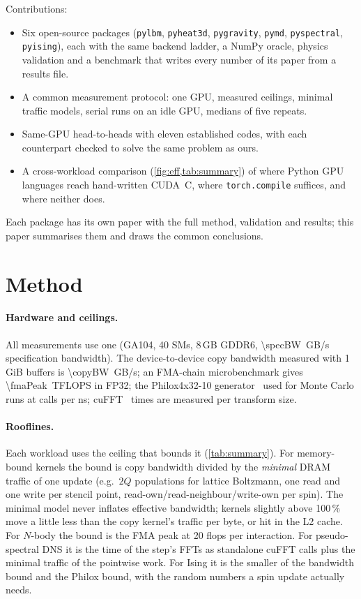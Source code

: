 \documentclass[11pt]{article}
\begin{document}
Contributions:
\begin{itemize}
  \item Six open-source packages (\texttt{pylbm}, \texttt{pyheat3d}, \texttt{pygravity},
        \texttt{pymd}, \texttt{pyspectral}, \texttt{pyising}), each with the same backend
        ladder, a NumPy oracle, physics validation and a benchmark that writes every number of
        its paper from a results file.
  \item A common measurement protocol: one GPU, measured ceilings, minimal traffic models,
        serial runs on an idle GPU, medians of five repeats.
  \item Same-GPU head-to-heads with eleven established codes, with each counterpart checked
        to solve the same problem as ours.
  \item A cross-workload comparison (\cref{fig:eff,tab:summary}) of where Python GPU languages
        reach hand-written CUDA~C, where \texttt{torch.compile} suffices, and where neither does.
\end{itemize}
Each package has its own paper with the full method, validation and results; this paper
summarises them and draws the common conclusions.

\section{Method}

\paragraph{Hardware and ceilings.} All measurements use one \gpuName{} (GA104, 40 SMs, 8\,GB
GDDR6, \SI{\specBW}{GB/s} specification bandwidth). The device-to-device copy bandwidth measured
with 1\,GiB buffers is \SI{\copyBW}{GB/s}; an FMA-chain microbenchmark gives
\SI{\fmaPeak}{TFLOPS} in FP32; the Philox4x32-10 generator~\citep{Salmon2011} used for Monte Carlo
runs at \philoxRate{} calls per ns; cuFFT~\citep{cufft} times are measured per transform size.

\paragraph{Rooflines.} Each workload uses the ceiling that bounds it (\cref{tab:summary}). For
memory-bound kernels the bound is copy bandwidth divided by the \emph{minimal} DRAM traffic of
one update (e.g.\ $2Q$ populations for lattice Boltzmann, one read and one write per stencil
point, read-own/read-neighbour/write-own per spin). The minimal model never inflates effective
bandwidth; kernels slightly above 100\,\% move a little less than the copy kernel's traffic per
byte, or hit in the L2 cache. For $N$-body the bound is the FMA peak at 20 flops per interaction.
For pseudo-spectral DNS it is the time of the step's FFTs as standalone cuFFT calls plus the
minimal traffic of the pointwise work. For Ising it is the smaller of the bandwidth bound and
the Philox bound, with the random numbers a spin update actually needs.
\end{document}

